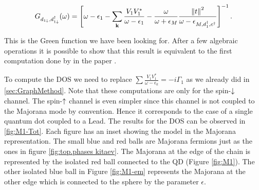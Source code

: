 \begin{equation}
    G_{d_{1\downarrow},d_{1\downarrow}^{\dagger}}(\omega)=\left[\omega-\epsilon_{1}-\sum_{\mathbf{k}}\frac{V_{1}V_{1}^{*}}{\omega-\epsilon_{1}}-\frac{\omega}{\omega+\epsilon_{M}}\frac{\left\Vert t\right\Vert ^{2}}{\omega -\epsilon_{M,d_1^\dagger,c^\dagger}}\right]^{-1}.
\end{equation}

This is the Green function we have been looking for. After a few algebraic operations it is possible to show that this result is equivalent to the first computation done by \citeauthor{liu_detecting_2011}  in the paper \cite{liu_detecting_2011}. 




To compute the DOS we need to replace $\sum \frac{V_1V^*_1}{\omega -\epsilon_k}= -i\Gamma_1$ as we already did in \ref{sec:GraphMethod}. Note that these computations are only for the spin-$\downarrow$ channel. The spin-$\uparrow$ channel is even simpler since this channel is not coupled to the Majorana mode by convention. Hence it corresponds to the case of a single quantum dot coupled to a Lead.  The results for the DOS can be observed in \ref{fig:M1-Tot}. Each figure has an inset showing the model in the Majorana representation. The small blue and red balls are Majorana fermions just as the ones in figure \ref{fig:top.phases kitaev}. The Majorana at the edge of the  chain is represented by the isolated red ball connected to the QD (Figure \ref{fig:M1}). The other isolated blue ball in Figure \ref{fig:M1-em} represents the Majorana at the other edge which is connected to the sphere by the parameter $\epsilon$. 

